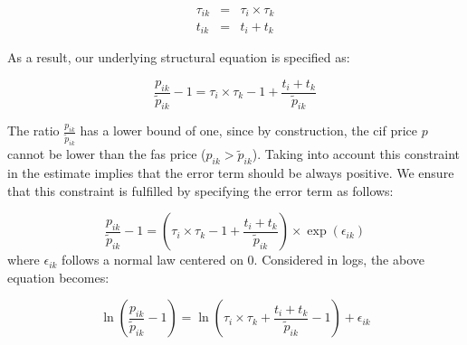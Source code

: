 \documentclass[a4paper,11pt]{article}
\begin{document}
\begin{eqnarray}
\tau_{ik} &=& \tau_{i} \times \tau_{k} \label{eq:ad-valorem}\\
t_{ik} &=& t_{i} + t_{k} \label{eq:add}
\end{eqnarray}

\noindent As a result, our underlying structural equation is specified as:

\begin{equation*}
\frac{p_{ik}}{\widetilde{p}_{ik}}-1 =\tau_{i} \times \tau_{k} -1 +\frac{t_{i} + t_{k}}{ \widetilde{p}_{ik}} \label{eq:theory_equation}
\end{equation*}

The ratio $\frac{p_{ik}}{\widetilde{p}_{ik}}$ has a lower bound of one, since by construction, the cif price $p$ cannot be lower than the fas price ($p_{ik}>\widetilde{p}_{ik}$). Taking into account this constraint in the estimate implies that the error term should be always positive. We ensure that this constraint is fulfilled by specifying the error term as follows:

\begin{equation*}
\frac{p_{ik}}{\widetilde{p}_{ik}}-1 =\left(\tau_{i} \times \tau_{k} -1+\frac{t_{i} + t_{k}}{\widetilde{p}_{ik}} \right)\times \exp(\epsilon_{ik})
\end{equation*}
\noindent where $\epsilon_{ik}$ follows a normal law centered on 0. Considered in logs, the above equation becomes:

\begin{equation}
\ln\left(\frac{p_{ik}}{\widetilde{p}_{ik}}-1 \right)= \ln \left(\tau_{i} \times \tau_{k}+\frac{t_{i} + t_{k}}{\widetilde{p}_{ik}}-1 \right) + \epsilon_{ik} \label{eq:equation0}
\end{equation}
\end{document}
